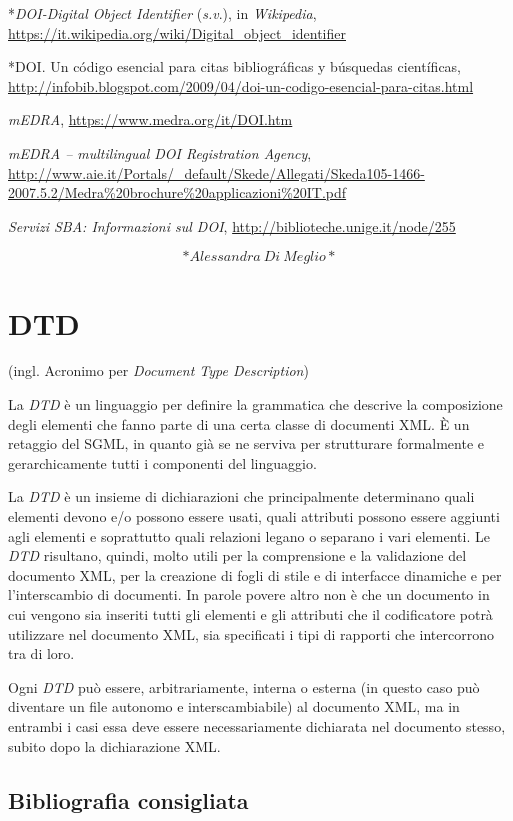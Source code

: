 \documentclass[
  b5paper,
  twoside,
  12pt,
  chapterprefix=false,
  bibliography=totocnumbered,
  parskip=false]{scrbook}
\begin{document}
*\emph{DOI-Digital Object Identifier} (\emph{s.v}.), in \emph{Wikipedia},
\url{https://it.wikipedia.org/wiki/Digital_object_identifier}

*DOI. Un código esencial para citas bibliográficas y búsquedas
científicas,
\url{http://infobib.blogspot.com/2009/04/doi-un-codigo-esencial-para-citas.html}

\emph{mEDRA}, \url{https://www.medra.org/it/DOI.htm}

\emph{mEDRA -- multilingual DOI Registration Agency},
\url{http://www.aie.it/Portals/_default/Skede/Allegati/Skeda105-1466-2007.5.2/Medra\%20brochure\%20applicazioni\%20IT.pdf}

\emph{Servizi SBA: Informazioni sul DOI},
\url{http://biblioteche.unige.it/node/255}

\[*Alessandra~Di~Meglio*\]

\hypertarget{dtd}{%
\chapter{DTD}\label{dtd}}

(ingl. Acronimo per \emph{Document Type Description})

La \emph{DTD} è un linguaggio per definire la grammatica che descrive la
composizione degli elementi che fanno parte di una certa classe di
documenti XML. È un retaggio del SGML, in quanto già se ne serviva per
strutturare formalmente e gerarchicamente tutti i componenti del
linguaggio.

La \emph{DTD} è un insieme di dichiarazioni che principalmente determinano
quali elementi devono e/o possono essere usati, quali attributi possono
essere aggiunti agli elementi e soprattutto quali relazioni legano o
separano i vari elementi. Le \emph{DTD} risultano, quindi, molto utili per la
comprensione e la validazione del documento XML, per la creazione di
fogli di stile e di interfacce dinamiche e per l'interscambio di
documenti. In parole povere altro non è che un documento in cui vengono
sia inseriti tutti gli elementi e gli attributi che il codificatore
potrà utilizzare nel documento XML, sia specificati i tipi di rapporti
che intercorrono tra di loro.

Ogni \emph{DTD} può essere, arbitrariamente, interna o esterna (in questo
caso può diventare un file autonomo e interscambiabile) al documento
XML, ma in entrambi i casi essa deve essere necessariamente dichiarata
nel documento stesso, subito dopo la dichiarazione XML.

\hypertarget{bibliografia-consigliata-8}{%
\section*{Bibliografia consigliata}\label{bibliografia-consigliata-8}}
\end{document}
